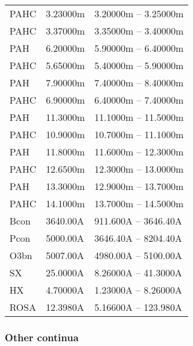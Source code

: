 \begin{table}
\begin{tabular}{lll}
 PAHC & 3.23000m & 3.20000m -- 3.25000m\\ 
 PAHC & 3.37000m & 3.35000m -- 3.40000m\\ 
 PAH  & 6.20000m & 5.90000m -- 6.40000m\\ 
 PAHC & 5.65000m & 5.40000m -- 5.90000m\\ 
 PAH  & 7.90000m & 7.40000m -- 8.40000m\\ 
 PAHC & 6.90000m & 6.40000m -- 7.40000m\\ 
 PAH  & 11.3000m & 11.1000m -- 11.5000m\\ 
 PAHC & 10.9000m & 10.7000m -- 11.1000m\\ 
 PAH  & 11.8000m & 11.6000m -- 12.3000m\\ 
 PAHC & 12.6500m & 12.3000m -- 13.0000m\\ 
 PAH  & 13.3000m & 12.9000m -- 13.7000m\\ 
 PAHC & 14.1000m & 13.7000m -- 14.5000m\\ 
 Bcon & 3640.00A & 911.600A -- 3646.40A\\ 
 Pcon & 5000.00A & 3646.40A -- 8204.40A\\ 
 O3bn & 5007.00A & 4980.00A -- 5100.00A\\ 
 SX   & 25.0000A & 8.26000A -- 41.3000A\\ 
 HX   & 4.70000A & 1.23000A -- 8.26000A\\ 
 ROSA & 12.3980A & 5.16600A -- 123.980A\\ 
\hline
\end{tabular}
\end{table}

\subsubsection{Other continua}

